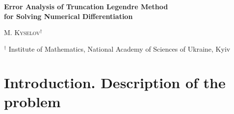 \documentclass[10pt]{extarticle}
\begin{document}
\begin{center}
{\bf Error Analysis of Truncation Legendre Method \\for Solving Numerical Differentiation}
\end{center}

\vspace*{5mm}
\centerline{\textsc{M. Kyselov$\!\!{}^{\dag}$}}

\vspace*{5mm}
\centerline{$\!\!{}^{\dag}\!\!$ Institute of Mathematics, National Academy of Sciences of Ukraine, Kyiv}

\begin{abstract}
We study the problem of numerical differentiation of functions from weighted Wiener classes.
We construct and analyze a truncation Legendre method to recover arbitrary order derivatives.
The main focus is on obtaining its error estimates in integral and uniform metrics.

\vspace*{3mm}

{\textit{Key words:} Numerical differentiation, Legendre polynomials, truncation method, weighted Wiener classes, error estimates}

\vspace*{3mm}

\textit{2020 Mathematics Subject Classification:} Primary: 65D25; Secondary: 41A25, 42C10.

\end{abstract}

\section{Introduction. Description of the problem}

\end{document}
